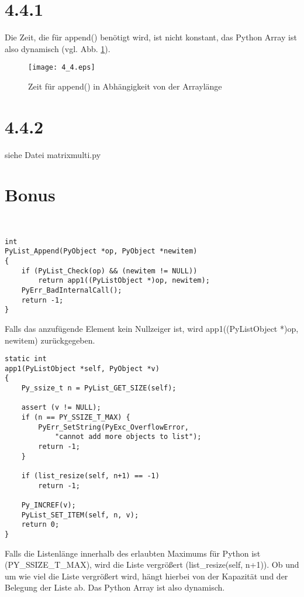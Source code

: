 \documentclass[a4paper,11pt]{article}
\theoremstyle{definition}
\theoremstyle{plain}
\theoremstyle{remark}
\begin{document}
\section*{4.4.1}
Die Zeit, die f\"ur append() ben\"otigt wird, ist nicht konstant, das Python Array ist also dynamisch (vgl. Abb. \ref{fig:arr}).
\begin{figure}[h!]
\centering
\texttt{[image: 4\_4.eps]}
\caption{Zeit f\"ur append() in Abh\"angigkeit von der Arrayl\"ange}
\label{fig:arr}
\end{figure}


\section*{4.4.2}
siehe Datei matrixmulti.py

\section*{Bonus}

\scriptsize
\begin{verbatim}


int
PyList_Append(PyObject *op, PyObject *newitem)
{
    if (PyList_Check(op) && (newitem != NULL))
        return app1((PyListObject *)op, newitem);
    PyErr_BadInternalCall();
    return -1;
}
\end{verbatim}
\normalsize
Falls das anzuf\"ugende Element kein Nullzeiger ist, wird app1((PyListObject *)op, newitem) zur\"uckgegeben.
\scriptsize
\begin{verbatim}
static int
app1(PyListObject *self, PyObject *v)
{
    Py_ssize_t n = PyList_GET_SIZE(self);

    assert (v != NULL);
    if (n == PY_SSIZE_T_MAX) {
        PyErr_SetString(PyExc_OverflowError,
            "cannot add more objects to list");
        return -1;
    }

    if (list_resize(self, n+1) == -1)
        return -1;

    Py_INCREF(v);
    PyList_SET_ITEM(self, n, v);
    return 0;
}
\end{verbatim}
\normalsize
Falls die Listenl\"ange innerhalb des erlaubten Maximums f\"ur Python ist (PY\_SSIZE\_T\_MAX), wird die Liste vergr\"o\ss ert (list\_resize(self, n+1)). Ob und um wie viel die Liste vergr\"o\ss ert wird, h\"angt hierbei von der Kapazit\"at und der Belegung der Liste ab. Das Python Array ist also dynamisch.
\end{document}
